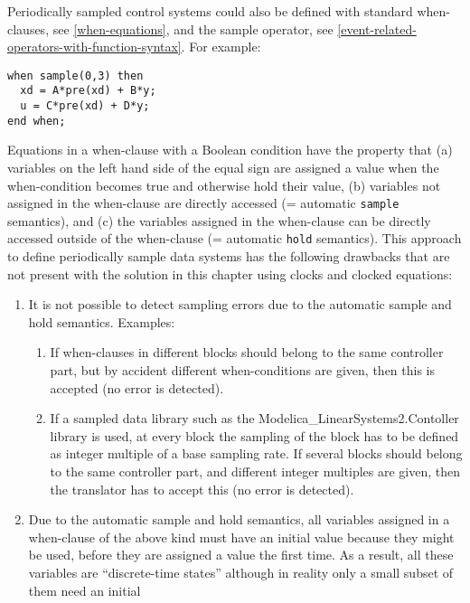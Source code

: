 \begin{nonnormative}
Periodically sampled control systems could also be defined with
standard when-clauses, see \cref{when-equations}, and the sample operator, see
\cref{event-related-operators-with-function-syntax}. For example:
\begin{lstlisting}[language=modelica]
when sample(0,3) then
  xd = A*pre(xd) + B*y;
  u = C*pre(xd) + D*y;
end when;
\end{lstlisting}

Equations in a when-clause with a Boolean condition have the
property that (a) variables on the left hand side of the equal sign are
assigned a value when the when-condition becomes true and otherwise hold
their value, (b) variables not assigned in the when-clause are directly
accessed (= automatic \lstinline!sample! semantics), and (c) the variables
assigned in the when-clause can be directly accessed outside of the
when-clause (= automatic \lstinline!hold! semantics). This approach to define
periodically sample data systems has the following drawbacks that are
not present with the solution in this chapter using clocks and clocked
equations:
\begin{enumerate}
\item
  It is not possible to detect sampling errors due to the
  automatic sample and hold semantics. Examples:
  \begin{enumerate}
  \def\labelenumii{\alph{enumii}.}
  \item
    If when-clauses in different blocks should belong to the same
    controller part, but by accident different when-conditions are
    given, then this is accepted (no error is detected).
  \item
    If a sampled data library such as the
    Modelica\_LinearSystems2.Contoller library is used, at every block
    the sampling of the block has to be defined as integer multiple of a
    base sampling rate. If several blocks should belong to the same
    controller part, and different integer multiples are given, then the
    translator has to accept this (no error is detected).
  \end{enumerate}
\item
  Due to the automatic sample and hold semantics, all variables
  assigned in a when-clause of the above kind must have an initial value
  because they might be used, before they are assigned a value the first
  time. As a result, all these variables are ``discrete-time states''
  although in reality only a small subset of them need an initial

\end{enumerate}
\end{nonnormative}
